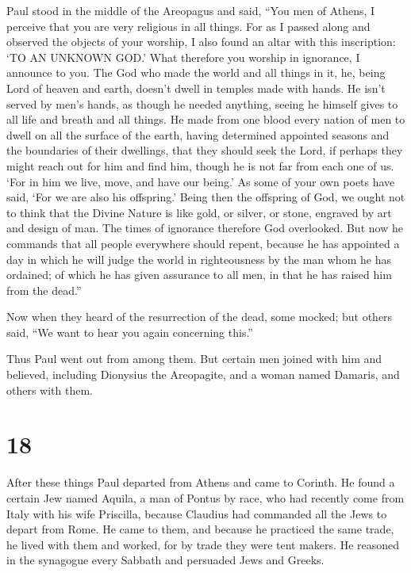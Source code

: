  Paul stood in the middle of the Areopagus and said, ``You
men of Athens, I perceive that you are very religious in all things.
 For as I passed along and observed the objects of your
worship, I also found an altar with this inscription: `TO AN UNKNOWN
GOD.' What therefore you worship in ignorance, I announce to you.
 The God who made the world and all things in it, he, being
Lord of heaven and earth, doesn't dwell in temples made with hands.
 He isn't served by men's hands, as though he needed
anything, seeing he himself gives to all life and breath and all things.
 He made from one blood every nation of men to dwell on all
the surface of the earth, having determined appointed seasons and the
boundaries of their dwellings,  that they should seek the
Lord, if perhaps they might reach out for him and find him, though he is
not far from each one of us.  `For in him we live, move,
and have our being.' As some of your own poets have said, `For we are
also his offspring.'  Being then the offspring of God, we
ought not to think that the Divine Nature is like gold, or silver, or
stone, engraved by art and design of man.  The times of
ignorance therefore God overlooked. But now he commands that all people
everywhere should repent,  because he has appointed a day
in which he will judge the world in righteousness by the man whom he has
ordained; of which he has given assurance to all men, in that he has
raised him from the dead.''

 Now when they heard of the resurrection of the dead, some
mocked; but others said, ``We want to hear you again concerning this.''

 Thus Paul went out from among them.  But
certain men joined with him and believed, including Dionysius the
Areopagite, and a woman named Damaris, and others with them.

\hypertarget{section-17}{%
\section{18}\label{section-17}}

 After these things Paul departed from Athens and came to
Corinth.  He found a certain Jew named Aquila, a man of
Pontus by race, who had recently come from Italy with his wife
Priscilla, because Claudius had commanded all the Jews to depart from
Rome. He came to them,  and because he practiced the same
trade, he lived with them and worked, for by trade they were tent
makers.  He reasoned in the synagogue every Sabbath and
persuaded Jews and Greeks.


